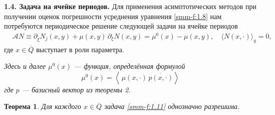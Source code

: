 \documentclass[a4paper,12pt]{article}
\newtheorem{theorem}{Теорема}[section]
\theoremstyle{definition}
\begin{document}
\smallskip
	\textbf{1.4. Задача на ячейке периодов.}
	Для применения асимптотических методов при получении оценок погрешности усреднения
	уравнения \eqref{smm-f:1.8} нам потребуются периодическое
	решение следующей задачи на ячейке периодов
	\begin{equation}\label{smm-f:1.11}
		\begin{aligned}
			&\mathcal{A}N\equiv \partial_{\bar\xi}N_j(x,y)+\mu(x,y)\,\partial_\xi N(x,y) =\mu^0(x)-\mu(x,y), \quad \langle N(x,\cdot)\rangle_y=0,
				\end{aligned}
	\end{equation}
	где $x\in \overline Q$ выступает в роли параметра.

	
	\textit{Здесь и далее  $\mu^0(x)$ --- функция, определённая
		формулой}
		\begin{equation*}
		\mu^0(x)=\left<\,\mu(x,\cdot)\,\overline{p(x,\cdot)}\right>
	\end{equation*}
	\textit{где} 	\textit{$p$ ---  базисный вектор из теоремы {\rm 2}}.
	
	\begin{theorem}\label{smm-th1.3}
	Для каждого $x\in\overline{Q}$ задача \eqref{smm-f:1.11}
		однозначно разрешима.
	\end{theorem}
\end{document}
